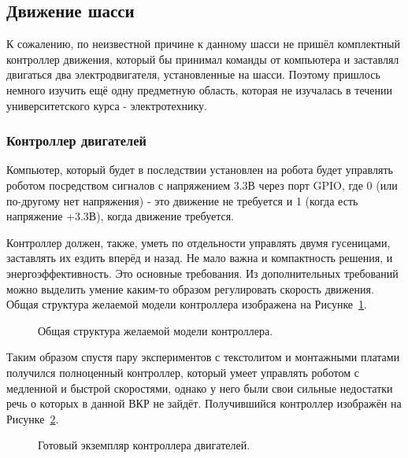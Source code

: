 \subsection{Движение шасси} \label{sub:robot-move}

К сожалению, по неизвестной причине к данному шасси не пришёл комплектный контроллер движения, который бы принимал команды от компьютера и заставлял двигаться два электродвигателя, установленные на шасси. Поэтому пришлось немного изучить ещё одну предметную область, которая не изучалась в течении университетского курса - электротехнику. 

\subsubsection{Контроллер двигателей}

Компьютер, который будет в последствии установлен на робота будет управлять роботом посредством сигналов с напряжением 3.3В через порт GPIO, где 0 (или по-другому нет напряжения) - это движение не требуется и 1 (когда есть напряжение +3.3В), когда движение требуется.

Контроллер должен, также, уметь по отдельности управлять двумя гусеницами, заставлять их ездить вперёд и назад. Не мало важна и компактность решения, и энергоэффективность. Это основные требования. Из дополнительных требований можно выделить умение каким-то образом регулировать скорость движения. Общая структура желаемой модели контроллера изображена на Рисунке~\ref{fig:structure-controller}. 

\begin{figure}[ht]
  \caption{Общая структура желаемой модели контроллера.}\label{fig:structure-controller}
\end{figure}

Таким образом спустя пару экспериментов с текстолитом и монтажными платами получился полноценный контроллер, который умеет управлять роботом с медленной и быстрой скоростями, однако у него были свои сильные недостатки речь о которых в данной ВКР не зайдёт. Получившийся контроллер изображён на Рисунке~\ref{fig:robot-controller}.

\begin{figure}[ht]
  \caption{Готовый экземпляр контроллера двигателей.}\label{fig:robot-controller}
\end{figure}

